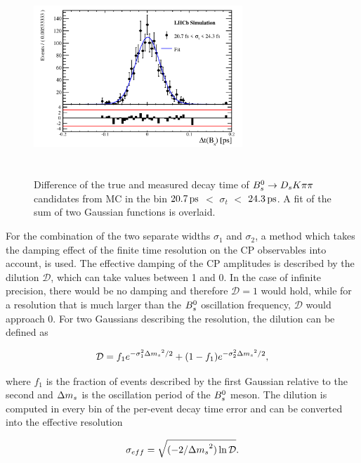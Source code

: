 \begin{figure}[h]
\includegraphics[height=7.4cm,width=0.7\textwidth]{figs/Resolution/SignalMC_bin_2.pdf}
\caption{Difference of the true and measured decay time of ${{B}^0_{s}}\rightarrow{\ensuremath{{D}_{s}}}{\ensuremath{K}}{\ensuremath{\pi}}{\ensuremath{\pi}}$ candidates from MC in the bin $20.7{\mathrm{ \,ps}}$ $<$ $\sigma_{t}$ $<$ $24.3{\mathrm{ \,ps}}$. A fit of the sum of two Gaussian functions is overlaid.}
\label{fig:ResoFit_24to29}
\end{figure}


For the combination of the two separate widths $\sigma_{1}$ and $\sigma_{2}$, a method which takes the damping effect of the finite time resolution on the CP observables into account, is used.
The effective damping of the CP amplitudes is described by the dilution $\mathcal{D}$, which can take values between 1 and 0. 
In the case of infinite precision, there would be no damping and therefore  $\mathcal{D} = 1$ would hold, while for a resolution that is much larger than the ${{B}^0_{s}}$ oscillation frequency, $\mathcal{D}$ would approach 0.
For two Gaussians describing the resolution, the dilution can be defined as \cite{Aaij:2017lff}

\begin{equation}
\mathcal{D} = f_{1}e^{-\sigma_{1}^{2}{\Delta m_{{s}}}^{2}/2} + (1 - f_{1}) e^{-\sigma_{2}^{2}{\Delta m_{{s}}}^{2}/2},
\label{eq:t-dilution}
\end{equation}   

where $f_{1}$ is the fraction of events described by the first Gaussian relative to the second and ${\Delta m_{{s}}}$ is the oscillation period of the ${{B}^0_{s}}$ meson. \newline   
The dilution is computed in every bin of the per-event decay time error and can be converted into the effective resolution

\begin{equation}
\sigma_{eff} = \sqrt{(-2/{\Delta m_{{s}}}^{2})\ln{\mathcal{D}}}.
\label{eq:effres}
\end{equation}




